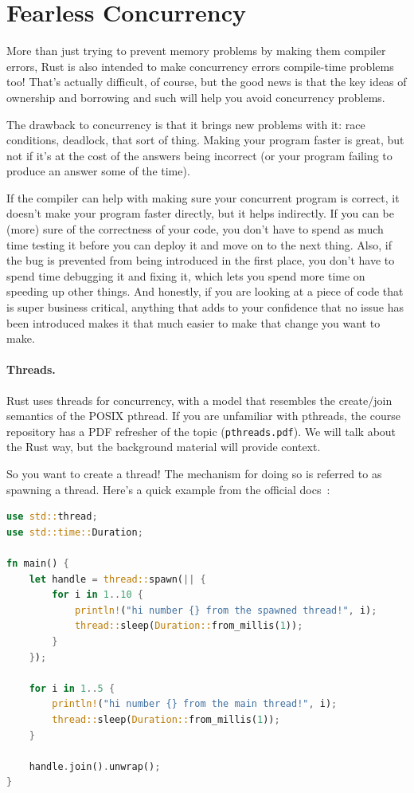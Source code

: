\documentclass[a4paper]{report}
\begin{document}
\section*{Fearless Concurrency}
More than just trying to prevent memory problems by making them compiler errors, Rust is also intended to make concurrency errors compile-time problems too! That's actually difficult, of course, but the good news is that the key ideas of ownership and borrowing and such will help you avoid concurrency problems.

The drawback to concurrency is that it brings new problems with it: race conditions, deadlock, that sort of thing. Making your program faster is great, but not if it's at the cost of the answers being incorrect (or your program failing to produce an answer some of the time).

If the compiler can help with making sure your concurrent program is correct, it doesn't make your program faster directly, but it helps indirectly. If you can be (more) sure of the correctness of your code, you don't have to spend as much time testing it before you can deploy it and move on to the next thing. Also, if the bug is prevented from being introduced in the first place, you don't have to spend time debugging it and fixing it, which lets you spend more time on speeding up other things. And honestly, if you are looking at a piece of code that is super business critical, anything that adds to your confidence that no issue has been introduced makes it that much easier to make that change you want to make.

\paragraph{Threads.} Rust uses threads for concurrency, with a model that resembles the create/join semantics of the POSIX pthread. If you are unfamiliar with pthreads, the course repository has a PDF refresher of the topic (\texttt{pthreads.pdf}). We will talk about the Rust way, but the background material will provide context.

So you want to create a thread! The mechanism for doing so is referred to as spawning a thread. Here's a quick example from the official docs~\cite{rustdocs}:

\begin{lstlisting}[language=Rust]
use std::thread;
use std::time::Duration;

fn main() {
    let handle = thread::spawn(|| {
        for i in 1..10 {
            println!("hi number {} from the spawned thread!", i);
            thread::sleep(Duration::from_millis(1));
        }
    });

    for i in 1..5 {
        println!("hi number {} from the main thread!", i);
        thread::sleep(Duration::from_millis(1));
    }

    handle.join().unwrap();
}
\end{lstlisting}
\end{document}
